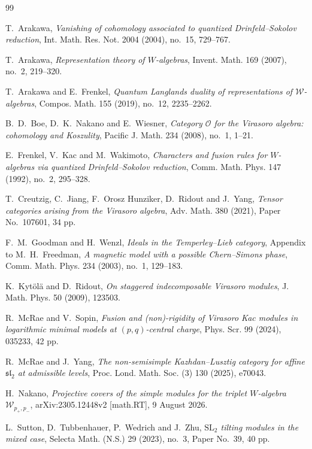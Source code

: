 \documentclass[12pt,leqno]{amsart}
\numberwithin{equation}{section}
\begin{document}
\begin{thebibliography}{99}

T.~Arakawa,
\emph{Vanishing of cohomology associated to quantized Drinfeld--Sokolov reduction},
Int. Math. Res. Not. 2004 (2004), no.~15, 729--767.

T.~Arakawa,
\emph{Representation theory of $W$-algebras},
Invent. Math. 169 (2007), no.~2, 219--320.


T.~Arakawa and E.~Frenkel,
\emph{Quantum Langlands duality of representations of $\mathcal W$-algebras},
Compos. Math. 155 (2019), no.~12, 2235--2262.

B.~D.~Boe, D.~K.~Nakano and E.~Wiesner,
\emph{Category $\mathcal O$ for the Virasoro algebra: cohomology and Koszulity},
Pacific J. Math. 234 (2008), no.~1, 1--21.

E.~Frenkel, V.~Kac and M.~Wakimoto,
\emph{Characters and fusion rules for $W$-algebras via quantized Drinfeld--Sokolov reduction},
Comm. Math. Phys. 147 (1992), no.~2, 295--328.

T.~Creutzig, C.~Jiang, F.~Orosz Hunziker, D.~Ridout and J.~Yang,
\emph{Tensor categories arising from the Virasoro algebra},
Adv. Math. 380 (2021), Paper No.~107601, 34 pp.

F.~M.~Goodman and H.~Wenzl,
\emph{Ideals in the Temperley--Lieb category},
Appendix to M.~H.~Freedman, \emph{A magnetic model with a possible Chern--Simons phase},
Comm. Math. Phys. 234 (2003), no.~1, 129--183.

K.~Kyt\"ol\"a and D.~Ridout,
\emph{On staggered indecomposable Virasoro modules},
J. Math. Phys. 50 (2009), 123503.

R.~McRae and V.~Sopin,
\emph{Fusion and (non)-rigidity of Virasoro Kac modules in logarithmic minimal models at $(p,q)$-central charge},
Phys. Scr. 99 (2024), 035233, 42 pp.

R.~McRae and J.~Yang,
\emph{The non-semisimple Kazhdan--Lusztig category for affine $\mathfrak{sl}_2$ at admissible levels},
Proc. Lond. Math. Soc. (3) 130 (2025), e70043.

H.~Nakano,
\emph{Projective covers of the simple modules for the triplet $W$-algebra $\mathcal W_{p_+,p_-}$},
arXiv:2305.12448v2 [math.RT], 9 August 2026.

L.~Sutton, D.~Tubbenhauer, P.~Wedrich and J.~Zhu,
\emph{$\mathrm{SL}_2$ tilting modules in the mixed case},
Selecta Math. (N.S.) 29 (2023), no.~3, Paper No.~39, 40 pp.

\end{thebibliography}
\end{document}
